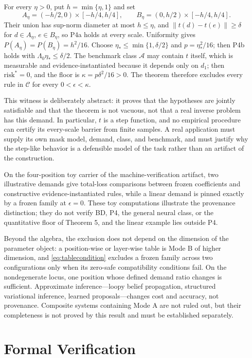 \documentclass[twoside,11pt]{article}
\begin{document}
For every $\eta>0$, put $h=\min\{\eta,1\}$ and set
\[
A_\eta=(-h/2,0)\times[-h/4,h/4],
\qquad
B_\eta=(0,h/2)\times[-h/4,h/4].
\]
Their union has sup-norm diameter at most $h\le\eta$, and $\|t(d)-t(e)\|\ge\delta$ for $d\in A_\eta$, $e\in B_\eta$, so P4a holds at every scale. Uniformity gives $P(A_\eta)=P(B_\eta)=h^2/16$. Choose $\eta_*\le\min\{1,\delta/2\}$ and $p=\eta_*^2/16$; then P4b holds with $\Lambda_0\eta_*\le\delta/2$. The benchmark class $\mathcal{A}$ may contain $t$ itself, which is measurable and evidence-instantiated because it depends only on $d_1$; then $\mathrm{risk}^*=0$, and the floor is $\kappa=p\delta^2/16>0$. The theorem therefore excludes every rule in $\mathcal{C}$ for every $0<\epsilon<\kappa$.

This witness is deliberately abstract: it proves that the hypotheses are jointly satisfiable and that the theorem is not vacuous, not that a real inverse problem has this demand. In particular, $t$ is a step function, and no empirical procedure can certify its every-scale barrier from finite samples. A real application must supply its own mask model, demand, class, and benchmark, and must justify why the step-like behavior is a defensible model of the task rather than an artifact of the construction.

On the four-position toy carrier of the machine-verification artifact, two illustrative demands give total-loss comparisons between frozen coefficients and constructive evidence-instantiated rules, while a linear demand is pinned exactly by a frozen family at $\epsilon=0$. These toy computations illustrate the provenance distinction; they do not verify BD, P4, the general neural class, or the quantitative floor of Theorem 5, and the linear example lies outside P4.

Beyond the algebra, the exclusion does not depend on the dimension of the parameter object: a position-wise or layer-wise table is Mode B of higher dimension, and \eqref{eq:tablecondition} excludes a frozen family across two configurations only when its zero-safe compatibility conditions fail. On the nondegenerate locus, one position whose defined demand ratio changes is sufficient. Approximate inference---loopy belief propagation, structured variational inference, learned proposals---changes cost and accuracy, not provenance. Composite systems containing Mode A are not ruled out, but their completeness is not proved by this result and must be established separately.

\section{Formal Verification}
\label{ch:verify}%
\end{document}
